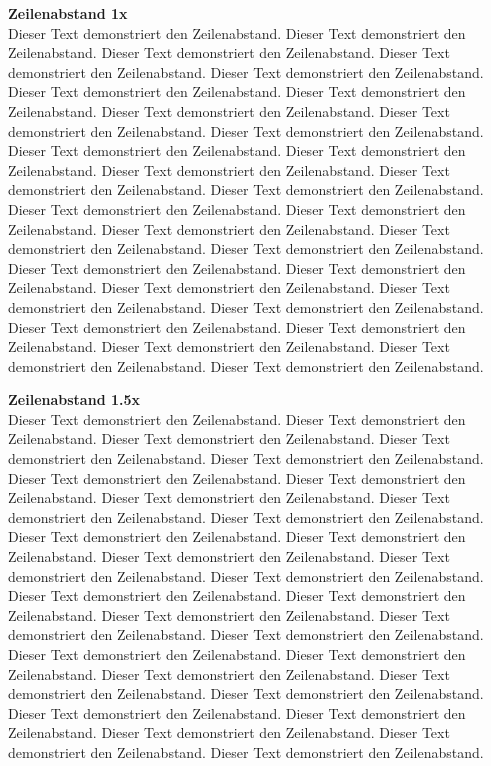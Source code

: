 \documentclass{article}
\begin{document}
  \singlespacing
  \textbf{Zeilenabstand 1x} \\
  Dieser Text demonstriert den Zeilenabstand. Dieser Text demonstriert den Zeilenabstand. Dieser Text demonstriert den Zeilenabstand. Dieser Text demonstriert den Zeilenabstand. Dieser Text demonstriert den Zeilenabstand. Dieser Text demonstriert den Zeilenabstand. Dieser Text demonstriert den Zeilenabstand. Dieser Text demonstriert den Zeilenabstand. Dieser Text demonstriert den Zeilenabstand. Dieser Text demonstriert den Zeilenabstand. Dieser Text demonstriert den Zeilenabstand. Dieser Text demonstriert den Zeilenabstand. Dieser Text demonstriert den Zeilenabstand. Dieser Text demonstriert den Zeilenabstand. Dieser Text demonstriert den Zeilenabstand. Dieser Text demonstriert den Zeilenabstand. Dieser Text demonstriert den Zeilenabstand. Dieser Text demonstriert den Zeilenabstand. Dieser Text demonstriert den Zeilenabstand. Dieser Text demonstriert den Zeilenabstand. Dieser Text demonstriert den Zeilenabstand. Dieser Text demonstriert den Zeilenabstand. Dieser Text demonstriert den Zeilenabstand. Dieser Text demonstriert den Zeilenabstand. Dieser Text demonstriert den Zeilenabstand. Dieser Text demonstriert den Zeilenabstand. Dieser Text demonstriert den Zeilenabstand. Dieser Text demonstriert den Zeilenabstand. Dieser Text demonstriert den Zeilenabstand. Dieser Text demonstriert den Zeilenabstand.

  \onehalfspacing
  \textbf{Zeilenabstand 1.5x} \\
  Dieser Text demonstriert den Zeilenabstand. Dieser Text demonstriert den Zeilenabstand. Dieser Text demonstriert den Zeilenabstand. Dieser Text demonstriert den Zeilenabstand. Dieser Text demonstriert den Zeilenabstand. Dieser Text demonstriert den Zeilenabstand. Dieser Text demonstriert den Zeilenabstand. Dieser Text demonstriert den Zeilenabstand. Dieser Text demonstriert den Zeilenabstand. Dieser Text demonstriert den Zeilenabstand. Dieser Text demonstriert den Zeilenabstand. Dieser Text demonstriert den Zeilenabstand. Dieser Text demonstriert den Zeilenabstand. Dieser Text demonstriert den Zeilenabstand. Dieser Text demonstriert den Zeilenabstand. Dieser Text demonstriert den Zeilenabstand. Dieser Text demonstriert den Zeilenabstand. Dieser Text demonstriert den Zeilenabstand. Dieser Text demonstriert den Zeilenabstand. Dieser Text demonstriert den Zeilenabstand. Dieser Text demonstriert den Zeilenabstand. Dieser Text demonstriert den Zeilenabstand. Dieser Text demonstriert den Zeilenabstand. Dieser Text demonstriert den Zeilenabstand. Dieser Text demonstriert den Zeilenabstand. Dieser Text demonstriert den Zeilenabstand. Dieser Text demonstriert den Zeilenabstand. Dieser Text demonstriert den Zeilenabstand. Dieser Text demonstriert den Zeilenabstand. Dieser Text demonstriert den Zeilenabstand.
\end{document}
